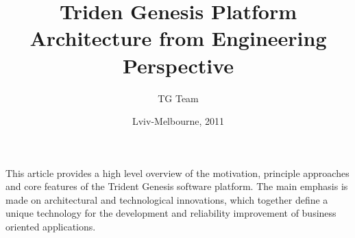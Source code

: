 \begin{titlepage}
\title{Triden Genesis Platform Architecture from Engineering Perspective}
\author{TG Team}
\date{Lviv-Melbourne, 2011}
\maketitle
\clearpage

  This article provides a high level overview of the motivation, principle approaches and core features of the Trident Genesis software platform.
  The main emphasis is made on architectural and technological innovations, which together define a unique technology for the development and reliability improvement of business oriented applications.

\clearpage
\tableofcontents
\clearpage

\end{titlepage}